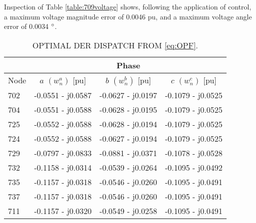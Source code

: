
\noindent Inspection of Table \ref{table:709voltage} shows, following the application of control, a maximum voltage magnitude error of 0.0046 pu, and a maximum voltage angle error of 0.0034 $\degree$.

\begin{table}[h]
	\centering
    \caption{OPTIMAL DER DISPATCH FROM \eqref{eq:OPF}.}	
    \begin{tabular}{| l | c | c | c |}
    \hline
    & \multicolumn{3}{|c|}{Phase } \\
    \hline
    Node & $a$ $\left( w_{n}^{a} \right)$ [pu] & $b$ $\left( w_{n}^{b} \right)$ [pu] & $c$ $\left( w_{n}^{c} \right)$ [pu] \\
    \hline
    702 & -0.0551 - j0.0587 & -0.0627 - j0.0197 & -0.1079 - j0.0525 \\
    704 & -0.0551 - j0.0588 & -0.0628 - j0.0195 & -0.1079 - j0.0525 \\
    725 & -0.0552 - j0.0588 & -0.0628 - j0.0194 & -0.1079 - j0.0525 \\
    724 & -0.0552 - j0.0588 & -0.0627 - j0.0194 & -0.1079 - j0.0525 \\
    729 & -0.0797 - j0.0833 & -0.0881 - j0.0371 & -0.1078 - j0.0528 \\
    732 & -0.1158 - j0.0314 & -0.0539 - j0.0264 & -0.1095 - j0.0492 \\
    735 & -0.1157 - j0.0318 & -0.0546 - j0.0260 & -0.1095 - j0.0491 \\
    737 & -0.1157 - j0.0318 & -0.0546 - j0.0260 & -0.1095 - j0.0491 \\
    711 & -0.1157 - j0.0320 & -0.0549 - j0.0258 & -0.1095 - j0.0491 \\
    \hline
    \end{tabular}
	\label{tab:wnode}
\end{table}


